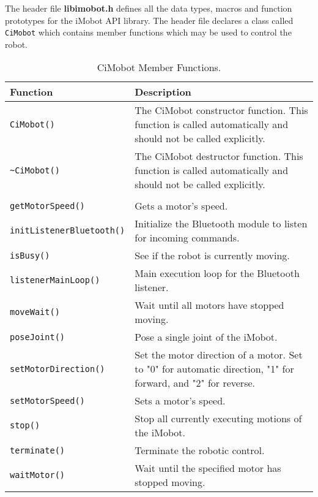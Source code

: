 \noindent
The header file {\bf libimobot.h} defines all the data types, macros 
and function prototypes for the iMobot API library. The header file
declares a class called \texttt{CiMobot} which contains member functions which
may be used to control the robot.

\begin{table}[!hp]
\capstart
\begin{center}
\caption{CiMobot Member Functions.}
\begin{tabular}{p{58 mm}p{97 mm}}
\hline
Function & Description \\
\hline
\texttt{CiMobot()} \dotfill & The CiMobot constructor function. This function
is called automatically and should not be called explicitly. \\
\texttt{\textasciitilde CiMobot()} \dotfill & The CiMobot destructor function. This function
is called automatically and should not be called explicitly. \\
& \\
\texttt{getMotorSpeed()} \dotfill & Gets a motor's speed. \\
\texttt{initListenerBluetooth()} \dotfill & Initialize the Bluetooth module to
listen for incoming commands. \\
\texttt{isBusy()} \dotfill & See if the robot is currently moving. \\
\texttt{listenerMainLoop()} \dotfill & Main execution loop for the Bluetooth listener. \\
\texttt{moveWait()} \dotfill & Wait until all motors have stopped moving. \\
\texttt{poseJoint()} \dotfill & Pose a single joint of the iMobot. \\
\texttt{setMotorDirection()} \dotfill & Set the motor direction of a motor. Set
to "0" for automatic direction, "1" for forward, and "2" for reverse. \\
\texttt{setMotorSpeed()} \dotfill & Sets a motor's speed. \\
\texttt{stop()} \dotfill & Stop all currently executing motions of the iMobot. \\
\texttt{terminate()} \dotfill & Terminate the robotic control. \\
\texttt{waitMotor()} \dotfill & Wait until the specified motor has stopped moving. \\
\hline
\end{tabular}
\end{center}
\label{mobilec_api_cbinary}
\end{table}

